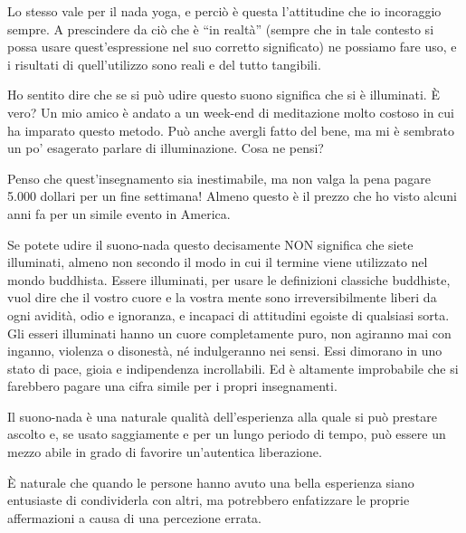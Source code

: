 Lo stesso vale per il nada yoga, e perciò è questa l'attitudine che io
incoraggio sempre. A prescindere da ciò che è ``in realtà'' (sempre che
in tale contesto si possa usare quest'espressione nel suo corretto
significato) ne possiamo fare uso, e i risultati di quell'utilizzo sono
reali e del tutto tangibili.

\clearpage

Ho sentito dire che se si può udire questo suono significa che si è
illuminati. È vero? Un mio amico è andato a un week-end di meditazione
molto costoso in cui ha imparato questo metodo. Può anche avergli fatto
del bene, ma mi è sembrato un po' esagerato parlare di illuminazione.
Cosa ne pensi?

Penso che quest'insegnamento sia inestimabile, ma non valga la pena
pagare 5.000 dollari per un fine settimana! Almeno questo è il prezzo
che ho visto alcuni anni fa per un simile evento in America.

Se potete udire il suono-nada questo decisamente NON significa che siete
illuminati, almeno non secondo il modo in cui il termine viene
utilizzato nel mondo buddhista. Essere illuminati, per usare le
definizioni classiche buddhiste, vuol dire che il vostro cuore e la
vostra mente sono irreversibilmente liberi da ogni avidità, odio e
ignoranza, e incapaci di attitudini egoiste di qualsiasi sorta. Gli
esseri illuminati hanno un cuore completamente puro, non agiranno mai
con inganno, violenza o disonestà, né indulgeranno nei sensi. Essi
dimorano in uno stato di pace, gioia e indipendenza incrollabili. Ed è
altamente improbabile che si farebbero pagare una cifra simile per i
propri insegnamenti.

Il suono-nada è una naturale qualità dell'esperienza alla quale si può
prestare ascolto e, se usato saggiamente e per un lungo periodo di
tempo, può essere un mezzo abile in grado di favorire un'autentica
liberazione.

È naturale che quando le persone hanno avuto una bella esperienza siano
entusiaste di condividerla con altri, ma potrebbero enfatizzare le
proprie affermazioni a causa di una percezione errata.

